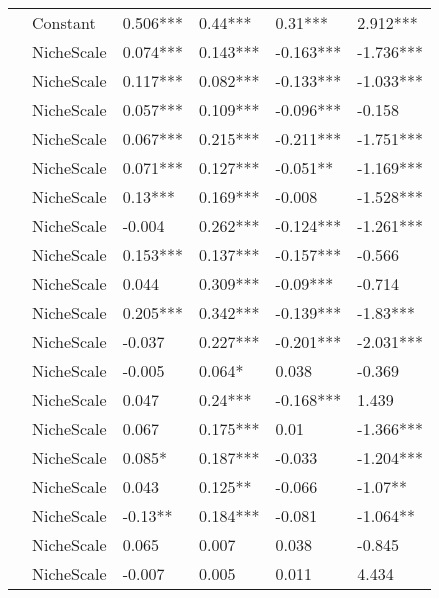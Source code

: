 \begin{longtable}[h!]{llllll}
\bottomrule
\endlastfoot
\multirow{20}{*}{Full} & Constant &            0.506*** &     0.44*** &    0.31*** &   2.912*** \\
     & NicheScale &            0.074*** &    0.143*** &  -0.163*** &  -1.736*** \\
     & NicheScale &            0.117*** &    0.082*** &  -0.133*** &  -1.033*** \\
     & NicheScale &            0.057*** &    0.109*** &  -0.096*** &     -0.158 \\
     & NicheScale &            0.067*** &    0.215*** &  -0.211*** &  -1.751*** \\
     & NicheScale &            0.071*** &    0.127*** &   -0.051** &  -1.169*** \\
     & NicheScale &             0.13*** &    0.169*** &     -0.008 &  -1.528*** \\
     & NicheScale &              -0.004 &    0.262*** &  -0.124*** &  -1.261*** \\
     & NicheScale &            0.153*** &    0.137*** &  -0.157*** &     -0.566 \\
     & NicheScale &               0.044 &    0.309*** &   -0.09*** &     -0.714 \\
     & NicheScale &            0.205*** &    0.342*** &  -0.139*** &   -1.83*** \\
     & NicheScale &              -0.037 &    0.227*** &  -0.201*** &  -2.031*** \\
     & NicheScale &              -0.005 &      0.064* &      0.038 &     -0.369 \\
     & NicheScale &               0.047 &     0.24*** &  -0.168*** &      1.439 \\
     & NicheScale &               0.067 &    0.175*** &       0.01 &  -1.366*** \\
     & NicheScale &              0.085* &    0.187*** &     -0.033 &  -1.204*** \\
     & NicheScale &               0.043 &     0.125** &     -0.066 &    -1.07** \\
     & NicheScale &             -0.13** &    0.184*** &     -0.081 &   -1.064** \\
     & NicheScale &               0.065 &       0.007 &      0.038 &     -0.845 \\
     & NicheScale &              -0.007 &       0.005 &      0.011 &      4.434 \\
\end{longtable}
